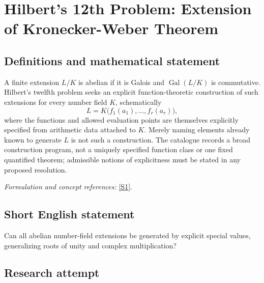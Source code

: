 \documentclass[11pt,a4paper]{article}
\newcommand{\sref}[2]{\hyperlink{source:#1:#2}{[S#2]}}
\newif\ifshowcatalogue
\newcommand{\cataloguescope}[1]{\ifshowcatalogue
 \paragraph{Exact scope in the supplied catalogue.}
 \begin{quote}\small #1\end{quote}\fi}
\numberwithin{equation}{section}
\begin{document}
\setcounter{section}{0}
\clearpage
\section*{\texorpdfstring{Hilbert's 12th Problem: Extension of Kronecker-Weber Theorem}{Hilbert's 12th Problem: Extension of Kronecker-Weber Theorem}}\label{statement}
\subsection{Definitions and mathematical statement}
A finite extension $L/K$ is abelian if it is Galois and $\operatorname{Gal}(L/K)$ is commutative. Hilbert's twelfth problem seeks an explicit function-theoretic construction of such extensions for every number field $K$, schematically
\[
 L=K\bigl(f_1(a_1),\ldots,f_r(a_r)\bigr),
\]
where the functions and allowed evaluation points are themselves explicitly specified from arithmetic data attached to $K$. Merely naming elements already known to generate $L$ is not such a construction. The catalogue records a broad construction program, not a uniquely specified function class or one fixed quantified theorem; admissible notions of explicitness must be stated in any proposed resolution.
\par\smallskip\textit{Formulation and concept references:} \sref{statement}{1}.
\cataloguescope{For each number field K, construct generators for its finite abelian extensions as special values of explicitly defined analytic or arithmetic functions associated with K, extending roots of unity over Q and complex multiplication over imaginary quadratic fields.}
\subsection{Short English statement}
Can all abelian number-field extensions be generated by explicit special values, generalizing roots of unity and complex multiplication?
\subsection{Research attempt}
\end{document}

